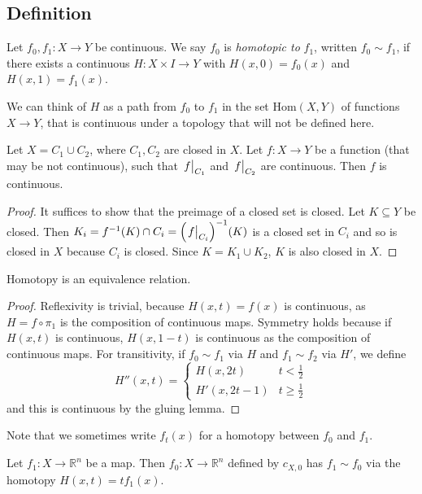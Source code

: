 \subsection{Definition}
\begin{definition}
	Let \( f_0, f_1 \colon X \to Y \) be continuous.
	We say \( f_0 \) is \emph{homotopic to} \( f_1 \), written \( f_0 \sim f_1 \), if there exists a continuous \( H \colon X \times I \to Y \) with \( H(x,0) = f_0(x) \) and \( H(x,1) = f_1(x) \).
\end{definition}
We can think of \( H \) as a path from \( f_0 \) to \( f_1 \) in the set \( \mathrm{Hom}(X,Y) \) of functions \( X \to Y \), that is continuous under a topology that will not be defined here.
\begin{lemma}
	Let \( X = C_1 \cup C_2 \), where \( C_1, C_2 \) are closed in \( X \).
	Let \( f \colon X \to Y \) be a function (that may be not continuous), such that \( \eval{f}_{C_1} \) and \( \eval{f}_{C_2} \) are continuous.
	Then \( f \) is continuous.
\end{lemma}
\begin{proof}
	It suffices to show that the preimage of a closed set is closed.
	Let \( K \subseteq Y \) be closed.
	Then \( K_i = f^{-1}(K) \cap C_i = \qty(\eval{f}_{C_i})^{-1}(K) \) is a closed set in \( C_i \) and so is closed in \( X \) because \( C_i \) is closed.
	Since \( K = K_1 \cup K_2 \), \( K \) is also closed in \( X \).
\end{proof}
\begin{lemma}
	Homotopy is an equivalence relation.
\end{lemma}
\begin{proof}
	Reflexivity is trivial, because \( H(x,t) = f(x) \) is continuous, as \( H = f \circ \pi_1 \) is the composition of continuous maps.
	Symmetry holds because if \( H(x,t) \) is continuous, \( H(x,1-t) \) is continuous as the composition of continuous maps.
	For transitivity, if \( f_0 \sim f_1 \) via \( H \) and \( f_1 \sim f_2 \) via \( H' \), we define
	\[ H''(x,t) = \begin{cases}
		H(x,2t) & t < \frac{1}{2} \\
		H'(x,2t-1) & t \geq \frac{1}{2}
	\end{cases} \]
	and this is continuous by the gluing lemma.
\end{proof}
Note that we sometimes write \( f_t(x) \) for a homotopy between \( f_0 \) and \( f_1 \).
\begin{example}
	Let \( f_1 \colon X \to \mathbb R^n \) be a map. Then \( f_0 \colon X \to \mathbb R^n \) defined by \( c_{X,0} \) has \( f_1 \sim f_0 \) via the homotopy \( H(x,t) = t f_1(x) \).
\end{example}
